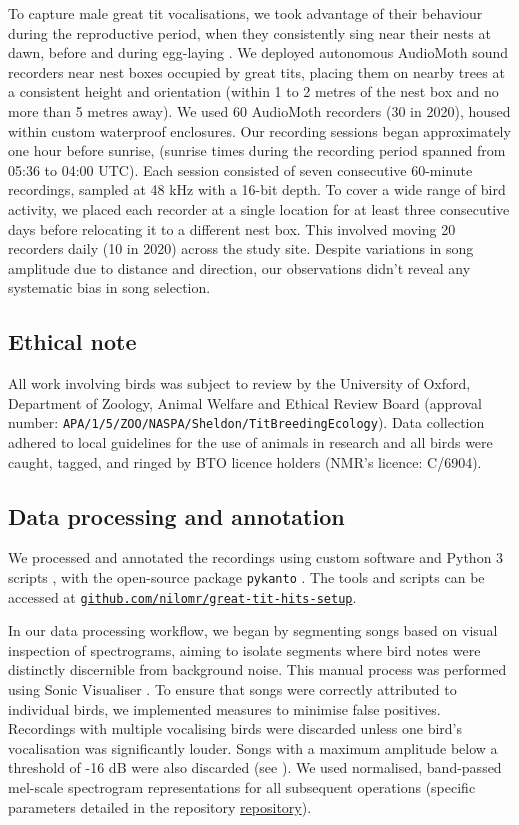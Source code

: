 To capture male great tit vocalisations, we took advantage of their behaviour during the reproductive period, when they consistently sing near their nests at dawn, before and during egg-laying \parencite{mace1987}. We deployed autonomous AudioMoth \autocite{hill2019} sound recorders near nest boxes occupied by great tits, placing them on nearby trees at a consistent height and orientation (within 1 to 2 metres of the nest box and no more than 5 metres away). We used 60 AudioMoth recorders (30 in 2020), housed within custom waterproof enclosures. Our recording sessions began approximately one hour before sunrise, (sunrise times during the recording period spanned from 05:36 to 04:00 UTC). Each session consisted of seven consecutive 60-minute recordings, sampled at 48 kHz with a 16-bit depth. To cover a wide range of bird activity, we placed each recorder at a single location for at least three consecutive days before relocating it to a different nest box. This involved moving 20 recorders daily (10 in 2020) across the study site. Despite variations in song amplitude due to distance and direction, our observations didn't reveal any systematic bias in song selection.

\subsection{Ethical note}
All work involving birds was subject to review by the University of Oxford, Department of Zoology, Animal Welfare and Ethical Review Board (approval number: \nolinkurl{APA/1/5/ZOO/NASPA/Sheldon/TitBreedingEcology}). Data collection adhered to local guidelines for the use of animals in research and all birds were caught, tagged, and ringed by BTO licence holders (NMR's licence: C/6904).

\subsection{Data processing and annotation}

We processed and annotated the recordings using custom software and Python 3 scripts \parencite{vanrossum1995}, with the open-source package \texttt{pykanto} \parencite{merinorecalde2023}. The tools and scripts can be accessed at \href{https://github.com/nilomr/great-tit-hits-setup}{\nolinkurl{github.com/nilomr/great-tit-hits-setup}}. 

\noindent In our data processing workflow, we began by segmenting songs based on visual inspection of spectrograms, aiming to isolate segments where bird notes were distinctly discernible from background noise. This manual process was performed using Sonic Visualiser \parencite{cannam2010}. To ensure that songs were correctly attributed to individual birds, we implemented measures to minimise false positives. Recordings with multiple vocalising birds were discarded unless one bird's vocalisation was significantly louder. Songs with a maximum amplitude below a threshold of -16 dB were also discarded (see \cite{merinorecalde2023a}). We used normalised, band-passed mel-scale spectrogram representations for all subsequent operations (specific parameters detailed in the repository \href{https://github.com/nilomr/great-tit-hits-setup}{repository}).

